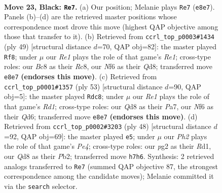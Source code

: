 \documentclass[11pt]{article}
\begin{document}
\clearpage

\begin{figure}[p]\centering
\begin{subfigure}{0.46\textwidth}\centering
\resizebox{\linewidth}{!}{%
\newchessgame
\chessboard[
  setfen={2bqrk2/Q1p2p1p/P4n2/2Pp2N1/1r3P2/8/2P3P1/R1B2RK1 b - - 0 23},
  showmover=false,
  pgfstyle=straightmove, color=movearrow, markmove={e8-e7}
]}
\caption{}
\end{subfigure}\hfill
\begin{subfigure}{0.46\textwidth}\centering
\resizebox{\linewidth}{!}{%
\newchessgame
\chessboard[
  setfen={2rqr1k1/p4p2/3n1pbp/8/5PNQ/5B2/P5PP/R4RK1 b - - 5 25},
  showmover=false,
  pgfstyle=straightmove, color=movearrow, markmove={e8-f8}
]}
\caption{}
\end{subfigure}
\\[4pt]
\begin{subfigure}{0.46\textwidth}\centering
\resizebox{\linewidth}{!}{%
\newchessgame
\chessboard[
  setfen={3r2k1/p4pp1/1p1q3p/2rnN3/8/PQ5P/1P2RPP1/4R1K1 b - - 3 27},
  showmover=false,
  pgfstyle=straightmove, color=movearrow, markmove={d8-c8}
]}
\caption{}
\end{subfigure}\hfill
\begin{subfigure}{0.46\textwidth}\centering
\resizebox{\linewidth}{!}{%
\newchessgame
\chessboard[
  setfen={1k1r1b2/p1q5/2b1p1r1/6p1/2BPP1p1/2N1Q3/1P3KP1/R2R4 w - - 0 25},
  showmover=false,
  pgfstyle=straightmove, color=movearrow, markmove={e4-e5}
]}
\caption{}
\end{subfigure}
\caption{\textbf{Move 23, Black: \texttt{Re7}.} (a) Our position; Melanie plays \texttt{Re7} (\texttt{e8e7}). Panels (b)--(d) are the retrieved master positions whose correspondence most drove this move (highest QAP objective among those that transfer to it). (b) Retrieved from \texttt{ccrl\_top\_p0003\#1434} (ply 49) [structural distance $d$=70, QAP obj=82]: the master played \texttt{Rf8}; under $\mu$ our \emph{Re1} plays the role of that game's \emph{Re1}; cross-type roles: our \emph{B}c8 as their \emph{R}c8, our \emph{N}f6 as their \emph{Q}d8; transferred move \texttt{e8e7} \textbf{(endorses this move)}. (c) Retrieved from \texttt{ccrl\_top\_p0001\#1357} (ply 53) [structural distance $d$=90, QAP obj=5]: the master played \texttt{Rdc8}; under $\mu$ our \emph{Re1} plays the role of that game's \emph{Rd1}; cross-type roles: our \emph{Q}d8 as their \emph{P}a7, our \emph{N}f6 as their \emph{Q}d6; transferred move \texttt{e8e7} \textbf{(endorses this move)}. (d) Retrieved from \texttt{ccrl\_top\_p0002\#3203} (ply 48) [structural distance $d$=92, QAP obj=69]: the master played \texttt{e5}; under $\mu$ our \emph{Ph2} plays the role of that game's \emph{Pe4}; cross-type roles: our \emph{p}g2 as their \emph{R}d1, our \emph{Q}d8 as their \emph{P}b2; transferred move \texttt{h7h6}. Synthesis: 2 retrieved analogs transferred to \texttt{Re7} (summed QAP objective 87, the strongest correspondence among the candidate moves); Melanie committed it via the \texttt{search} selector.}
\label{fig:thought-m45}
\end{figure}
\end{document}

